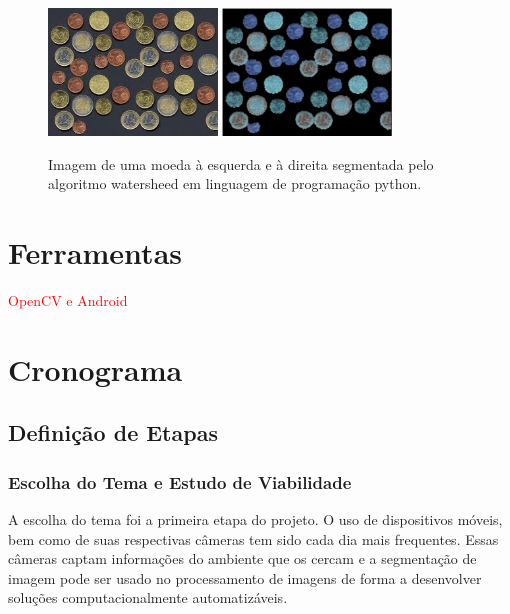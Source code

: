 \begin{figure}[!htb]
 \centering
 \def\baselinestretch{1}\small\normalsize
 \includegraphics[width=0.4\textwidth]{img/stf-coins.jpg}\qquad
 \includegraphics[width=0.4\textwidth]{img/stf-coins-watersheed.jpg} 
 \caption{\label{fig:coins}Imagem de uma moeda à esquerda e à direita segmentada pelo algoritmo watersheed em linguagem de programação python.}
\end{figure}
 
 


\chapter{Ferramentas}

\textcolor{red}{OpenCV e Android}


\chapter{Cronograma}
\section{Definição de Etapas}
\subsection{Escolha do Tema e Estudo de Viabilidade}
A escolha do tema foi a primeira etapa do projeto. O uso de dispositivos móveis, bem como de suas respectivas câmeras tem sido cada dia mais frequentes. Essas câmeras captam informações do ambiente que os cercam e a segmentação de imagem pode ser usado no processamento de imagens de forma a desenvolver soluções computacionalmente automatizáveis.

